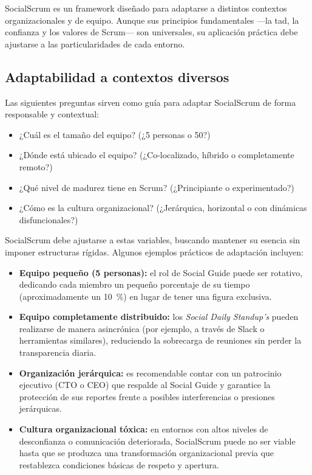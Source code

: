 SocialScrum es un framework diseñado para adaptarse a distintos contextos organizacionales y de equipo.
Aunque sus principios fundamentales —la \acrfull{tad}, la confianza y los valores de Scrum— son universales, su aplicación práctica debe ajustarse a las particularidades de cada entorno.

\subsection{Adaptabilidad a contextos diversos}

Las siguientes preguntas sirven como guía para adaptar SocialScrum de forma responsable y contextual:

\begin{itemize}
    \item ¿Cuál es el tamaño del equipo? (¿5 personas o 50?)
    \item ¿Dónde está ubicado el equipo? (¿Co-localizado, híbrido o completamente remoto?)
    \item ¿Qué nivel de madurez tiene en Scrum? (¿Principiante o experimentado?)
    \item ¿Cómo es la cultura organizacional? (¿Jerárquica, horizontal o con dinámicas disfuncionales?)
\end{itemize}

SocialScrum debe ajustarse a estas variables, buscando mantener su esencia sin imponer estructuras rígidas. Algunos ejemplos prácticos de adaptación incluyen:

\begin{itemize}
    \item \textbf{Equipo pequeño (5 personas):} el rol de Social Guide puede ser rotativo, dedicando cada miembro un pequeño porcentaje de su tiempo (aproximadamente un 10~\%) en lugar de tener una figura exclusiva.
    \item \textbf{Equipo completamente distribuido:} los \textit{Social Daily Standup's} pueden realizarse de manera asincrónica (por ejemplo, a través de Slack o herramientas similares), reduciendo la sobrecarga de reuniones sin perder la transparencia diaria.
    \item \textbf{Organización jerárquica:} es recomendable contar con un patrocinio ejecutivo (CTO o CEO) que respalde al Social Guide y garantice la protección de sus reportes frente a posibles interferencias o presiones jerárquicas.
    \item \textbf{Cultura organizacional tóxica:} en entornos con altos niveles de desconfianza o comunicación deteriorada, SocialScrum puede no ser viable hasta que se produzca una transformación organizacional previa que restablezca condiciones básicas de respeto y apertura.
\end{itemize}

